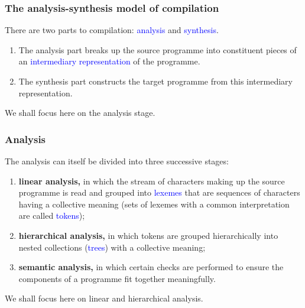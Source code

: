 \documentclass[compress,dvips,xcolor={dvipsnames},t]{beamer}
\begin{document}
% 
\begin{frame}
\frametitle{The analysis-synthesis model of compilation}


There are two parts to compilation: \textcolor{blue}{analysis} and
\textcolor{blue}{synthesis}.
\begin{enumerate}
 
  \item The analysis part breaks up the source programme into
  constituent pieces of an \textcolor{blue}{intermediary representation} of the
  programme.

  \item The synthesis part constructs the target programme from this
  intermediary representation.

\end{enumerate}

We shall focus here on the analysis stage.

\end{frame}


% 
\begin{frame}
\frametitle{Analysis}


The analysis can itself be divided into three successive stages:
\begin{enumerate}

  \item \textbf{linear analysis,} in which the stream of characters
    making up the source programme is read and grouped into
    \textcolor{blue}{lexemes} that are sequences of characters having a
    collective meaning (sets of lexemes with a common interpretation
    are called \textcolor{blue}{tokens});

  \item \textbf{hierarchical analysis,} in which tokens are grouped
    hierarchically into nested collections (\textcolor{blue}{trees}) with a
    collective meaning;

  \item \textbf{semantic analysis,} in which certain checks are
    performed to ensure the components of a programme fit together
    meaningfully.

\end{enumerate}
We shall focus here on linear and hierarchical analysis.

\end{frame}
\end{document}
